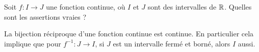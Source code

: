 \begin{question}

Soit $f : I \to J$ une fonction continue, où $I$ et $J$ sont des intervalles de $\mathbb{R}$. Quelles sont les assertions vraies ?
\begin{answers}



\end{answers}
\begin{explanations}
La bijection réciproque d'une fonction continue est continue. En particulier cela implique que pour $f^{-1} : J \to I$, si $J$ est un intervalle fermé et borné, alors $I$ aussi.
\end{explanations}
\end{question}

